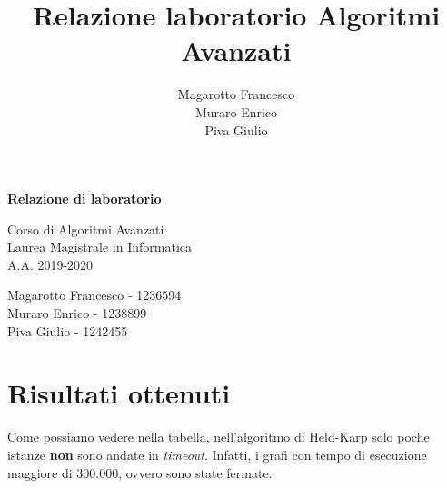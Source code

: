 \documentclass[a4paper]{article}
\title{Relazione laboratorio Algoritmi Avanzati}
\author{Magarotto Francesco\\Muraro Enrico\\Piva Giulio}
\begin{document}
\begin{titlepage}
  \vspace*{5cm}
  \begin{center}
    \Large\bfseries
    Relazione di laboratorio
  \end{center}
  \begin{center}
    \large
    Corso di Algoritmi Avanzati\\
    Laurea Magistrale in Informatica\\A.A. 2019-2020
  \end{center}
  \vspace{4cm plus 1fill}
  \begin{flushleft}
    \large
    Magarotto Francesco - 1236594\\Muraro Enrico - 1238899 \\Piva Giulio - 1242455
  \end{flushleft}
\end{titlepage}
\newpage



\section{Risultati ottenuti}
	\begin{figure}[H]
	\centering
	
	\end{figure}
\vspace*{6.5cm}
Come possiamo vedere nella tabella, nell'algoritmo di Held-Karp solo poche istanze \textbf{non} sono andate in \textit{timeout}. Infatti,  i grafi con tempo di esecuzione maggiore di 300.000, ovvero sono state fermate. 
\end{document}
